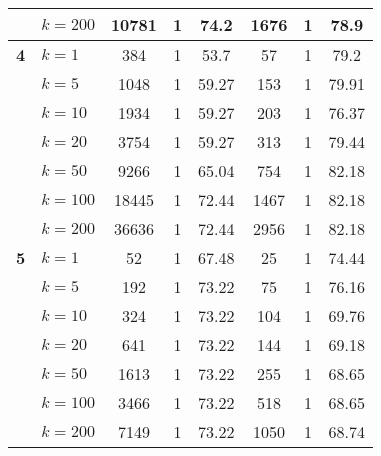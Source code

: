 \begin{table}[htbp]
\begin{tabular}{|l|l|c|c|c|c|c|c|}
     & $k=200$ & 10781 & 1 & 74.2 & 1676 & 1 & 78.9 \\ \hline
    \multicolumn{1}{|r|}{\textbf{4}} & $k=1$ & 384 & 1 & 53.7 & 57 & 1 & 79.2 \\ 
     & $k=5$ & 1048 & 1 & 59.27 & 153 & 1 & 79.91 \\ 
     & $k=10$ & 1934 & 1 & 59.27 & 203 & 1 & 76.37 \\ 
     & $k=20$ & 3754 & 1 & 59.27 & 313 & 1 & 79.44 \\ 
     & $k=50$ & 9266 & 1 & 65.04 & 754 & 1 & 82.18 \\ 
     & $k=100$ & 18445 & 1 & 72.44 & 1467 & 1 & 82.18 \\ 
     & $k=200$ & 36636 & 1 & 72.44 & 2956 & 1 & 82.18 \\ \hline
    \multicolumn{1}{|r|}{\textbf{5}} & $k=1$ & 52 & 1 & 67.48 & 25 & 1 & 74.44 \\ 
     & $k=5$ & 192 & 1 & 73.22 & 75 & 1 & 76.16 \\ 
     & $k=10$ & 324 & 1 & 73.22 & 104 & 1 & 69.76 \\ 
     & $k=20$ & 641 & 1 & 73.22 & 144 & 1 & 69.18 \\ 
     & $k=50$ & 1613 & 1 & 73.22 & 255 & 1 & 68.65 \\ 
     & $k=100$ & 3466 & 1 & 73.22 & 518 & 1 & 68.65 \\ 
     & $k=200$ & 7149 & 1 & 73.22 & 1050 & 1 & 68.74 \\ \hline
    \end{tabular}
    \end{table}
